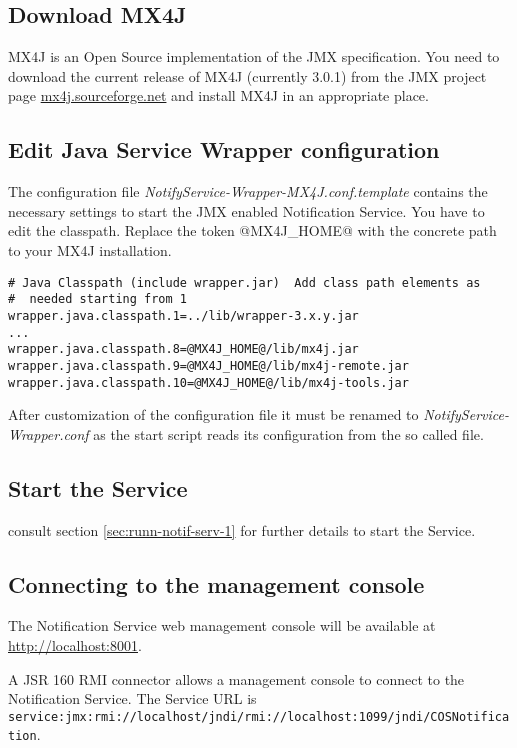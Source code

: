 \subsection{Download MX4J}

MX4J is an Open Source implementation of the JMX specification. You need to download the current release of MX4J (currently 3.0.1) from the JMX project page \href{mx4j.sourceforge.net}{mx4j.sourceforge.net} and install MX4J in an appropriate place.

\subsection{Edit Java Service Wrapper configuration}

The configuration file \emph{NotifyService-Wrapper-MX4J.conf.template} contains the necessary settings to start the
JMX enabled Notification Service. You have to edit the classpath. Replace the token @MX4J\_HOME@ with the concrete path to your MX4J installation.

\begin{verbatim}
# Java Classpath (include wrapper.jar)  Add class path elements as
#  needed starting from 1
wrapper.java.classpath.1=../lib/wrapper-3.x.y.jar
...
wrapper.java.classpath.8=@MX4J_HOME@/lib/mx4j.jar
wrapper.java.classpath.9=@MX4J_HOME@/lib/mx4j-remote.jar
wrapper.java.classpath.10=@MX4J_HOME@/lib/mx4j-tools.jar
\end{verbatim}

After customization of the configuration file it must be renamed to \emph{NotifyService-Wrapper.conf} as the start script reads its configuration from the so called file.

\subsection{Start the Service}
consult section \ref{sec:runn-notif-serv-1} for further details to start the Service.

\subsection{Connecting to the management console}

The Notification Service web management console will be available at
\href{http://localhost:8001}{http://localhost:8001}.

A JSR 160 RMI connector allows a management console to connect to the Notification Service. The Service URL is \texttt{service:jmx:rmi://localhost/jndi/rmi://localhost:1099/jndi/COSNotification}.

